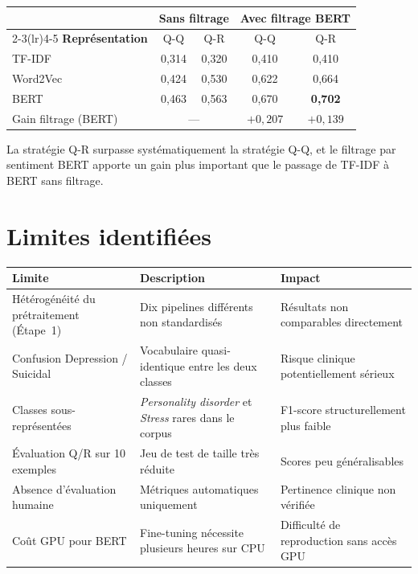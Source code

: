 \documentclass[12pt,a4paper]{report}
\renewcommand{\arraystretch}{1}
\begin{document}
\begin{center}
\renewcommand{\arraystretch}{1.2}
\begin{tabular}{@{}lcccc@{}}
\toprule
 & \multicolumn{2}{c}{\textbf{Sans filtrage}} & \multicolumn{2}{c}{\textbf{Avec filtrage BERT}} \\
\cmidrule(lr){2-3}\cmidrule(lr){4-5}
\textbf{Représentation} & Q-Q & Q-R & Q-Q & Q-R \\
\midrule
TF-IDF   & 0,314 & 0,320 & 0,410 & 0,410 \\
Word2Vec & 0,424 & 0,530 & 0,622 & 0,664 \\
BERT     & 0,463 & 0,563 & 0,670 & \textbf{0,702} \\
\midrule
Gain filtrage (BERT) & \multicolumn{2}{c}{---} & $+0{,}207$ & $+0{,}139$ \\
\bottomrule
\end{tabular}
\end{center}

La stratégie Q-R surpasse systématiquement la stratégie Q-Q, et le filtrage par sentiment BERT
apporte un gain plus important que le passage de TF-IDF à BERT sans filtrage.

\section{Limites identifiées}

\begin{center}
\renewcommand{\arraystretch}{1.3}
\begin{tabularx}{\textwidth}{@{}>{\raggedright\arraybackslash}p{3.5cm}X X@{}}
\toprule
\textbf{Limite} & \textbf{Description} & \textbf{Impact} \\
\midrule
Hétérogénéité du prétraitement (Étape~1)
  & Dix pipelines différents non standardisés
  & Résultats non comparables directement \\
Confusion Depression / Suicidal
  & Vocabulaire quasi-identique entre les deux classes
  & Risque clinique potentiellement sérieux \\
Classes sous-représentées
  & \textit{Personality disorder} et \textit{Stress} rares dans le corpus
  & F1-score structurellement plus faible \\
Évaluation Q/R sur 10 exemples
  & Jeu de test de taille très réduite
  & Scores peu généralisables \\
Absence d'évaluation humaine
  & Métriques automatiques uniquement
  & Pertinence clinique non vérifiée \\
Coût GPU pour BERT
  & Fine-tuning nécessite plusieurs heures sur CPU
  & Difficulté de reproduction sans accès GPU \\
\bottomrule
\end{tabularx}
\end{center}
\end{document}
